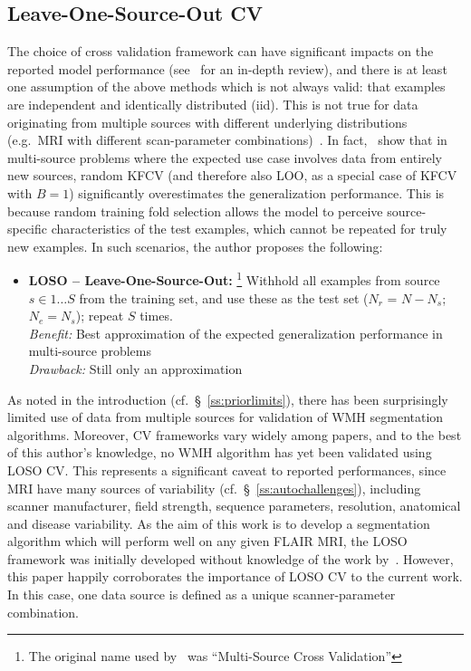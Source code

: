 \subsection{Leave-One-Source-Out CV}
The choice of cross validation framework can have significant impacts
on the reported model performance (see~\cite{Arlot2010} for an in-depth review),
and there is at least one assumption of the above methods which is not always valid:
that examples are independent and identically distributed (iid).
This is not true for data originating from multiple sources with different underlying distributions
(e.g.\ MRI with different scan-parameter combinations)~\cite{Geras2013}.
In fact,~\citeauthor{Geras2013} show that in multi-source problems
where the expected use case involves data from entirely new sources,
random KFCV (and therefore also LOO, as a special case of KFCV with $B=1$)
significantly overestimates the generalization performance.
This is because random training fold selection allows the model
to perceive source-specific characteristics of the test examples,
which cannot be repeated for truly new examples.
In such scenarios, the author proposes the following:
\begin{itemize}
  \item\textbf{LOSO -- Leave-One-Source-Out:}%
  \footnote{The original name used by~\citeauthor{Geras2013} %
    was ``Multi-Source Cross Validation''}
  Withhold all examples from source $s\in 1\dots S$ from the training set,
  and use these as the test set ($N_r$ = $N-N_s$; $N_e = N_s$);
  repeat $S$ times.
  \\\textit{Benefit:} Best approximation of the expected generalization performance
  in multi-source problems
  \\\textit{Drawback:} Still only an approximation
\end{itemize}
As noted in the introduction (cf.~\S~\ref{ss:priorlimits}),
there has been surprisingly limited use of data from multiple sources
for validation of WMH segmentation algorithms.
Moreover, CV frameworks vary widely among papers, and to the best of this author's knowledge,
no WMH algorithm has yet been validated using LOSO CV.
This represents a significant caveat to reported performances,
since MRI have many sources of variability (cf.~\S~\ref{ss:autochallenges}),
including scanner manufacturer, field strength, sequence parameters, resolution,
anatomical and disease variability.
As the aim of this work is to develop a segmentation algorithm
which will perform well on any given FLAIR MRI,
the LOSO framework was initially developed without knowledge of the work by~\citeauthor{Geras2013}.
However, this paper happily corroborates the importance of LOSO CV to the current work.
In this case, one data source is defined as a unique scanner-parameter combination.
